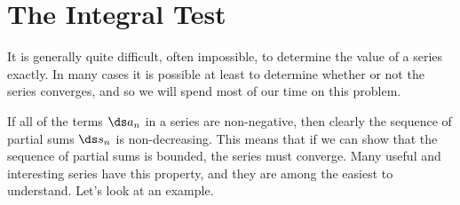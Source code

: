 \section{The Integral Test}\label{sec:IntegralTest}

It is generally quite difficult, often impossible, to determine
the value of a series exactly. In many cases it is possible at least
to determine whether or not the series converges, and so we will spend
most of our time on this problem.

If all of the terms $\ds a_n$ in a series are non-negative, then clearly 
the sequence of partial sums $\ds s_n$ is non-decreasing. This means that
if we can show that the sequence of partial sums is bounded, the
series must converge. Many useful and interesting series have this property,
and they are among the easiest to understand. Let's look at
an example.

